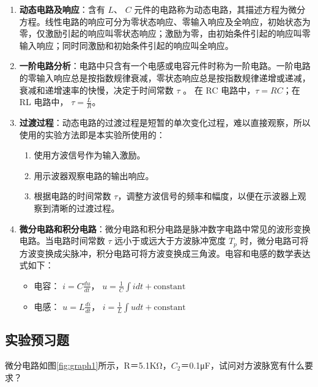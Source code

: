 \documentclass[dvipsnames, svgnames,a4paper,11pt]{article}
\begin{document}
	\begin{enumerate}
		\item \textbf{动态电路及响应}：含有 \( L \)、 \( C \) 元件的电路称为动态电路，其描述方程为微分方程。线性电路的响应可分为零状态响应、零输入响应及全响应，初始状态为零，仅激励引起的响应叫零状态响应；激励为零，由初始条件引起的响应叫零输入响应；同时同激励和初始条件引起的响应叫全响应。
		
		\item \textbf{一阶电路分析}：电路中只含有一个电感或电容元件时称为一阶电路。一阶电路的零输入响应总是按指数规律衰减，零状态响应总是按指数规律递增或递减，衰减和递增速率的快慢，决定于时间常数 $\tau$ 。
		在 RC 电路中，$\tau=RC$；在 RL 电路中， $\tau=\frac LR$。
		
		\item \textbf{过渡过程}：动态电路的过渡过程是短暂的单次变化过程，难以直接观察，所以使用的实验方法即是本实验所使用的：
		 \begin{enumerate}
			\item 使用方波信号作为输入激励。
			\item 用示波器观察电路的输出响应。
			\item 根据电路的时间常数 \( \tau \)，调整方波信号的频率和幅度，以便在示波器上观察到清晰的过渡过程。
		\end{enumerate}
		
		\item \textbf{微分电路和积分电路}：微分电路和积分电路是脉冲数字电路中常见的波形变换电路。当电路时间常数 \( \tau \) 远小于或远大于方波脉冲宽度 \( T_p \) 时，微分电路可将方波变换成尖脉冲，积分电路可将方波变换成三角波。电容和电感的数学表达式如下：
		
		\begin{itemize}
			\item 电容： \( i= C \frac{du}{dt} \)， \( u = \frac{1}{C} \int i dt + \text{constant} \)
			\item 电感： \( u = L \frac{di}{dt} \)， \( i = \frac{1}{L} \int u dt + \text{constant} \)
		\end{itemize}
		
		
		
	\end{enumerate}
	
	
	
	\subsection{实验预习题}
	
	\begin{question}
		微分电路如图\ref*{fig:graph1}所示，R＝5.1KΩ，$C_2$＝0.1μF，试问对方波脉宽有什么要求？
	\end{question}
\end{document}

